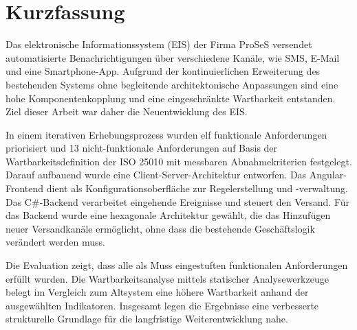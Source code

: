 \section*{Kurzfassung}
Das elektronische Informationssystem (EIS) der Firma ProSeS versendet automatisierte Benachrichtigungen über verschiedene Kanäle, wie SMS, E-Mail und eine Smartphone-App. Aufgrund der kontinuierlichen Erweiterung des bestehenden Systems ohne begleitende architektonische Anpassungen sind eine hohe Komponentenkopplung und eine eingeschränkte Wartbarkeit entstanden. Ziel dieser Arbeit war daher die Neuentwicklung des EIS.

In einem iterativen Erhebungsprozess wurden elf funktionale Anforderungen priorisiert und 13 nicht-funktionale Anforderungen auf Basis der Wartbarkeitsdefinition der ISO 25010 mit messbaren Abnahmekriterien festgelegt. Darauf aufbauend wurde eine Client-Server-Architektur entworfen. Das Angular-Frontend dient als Konfigurationsoberfläche zur Regelerstellung und -verwaltung. Das C\#-Backend verarbeitet eingehende Ereignisse und steuert den Versand. Für das Backend wurde eine hexagonale Architektur gewählt, die das Hinzufügen neuer Versandkanäle ermöglicht, ohne dass die bestehende Geschäftslogik verändert werden muss.

Die Evaluation zeigt, dass alle als Muss eingestuften funktionalen Anforderungen erfüllt wurden. Die Wartbarkeitsanalyse mittels statischer Analysewerkzeuge belegt im Vergleich zum Altsystem eine höhere Wartbarkeit anhand der ausgewählten Indikatoren. Insgesamt legen die Ergebnisse eine verbesserte strukturelle Grundlage für die langfristige Weiterentwicklung nahe.